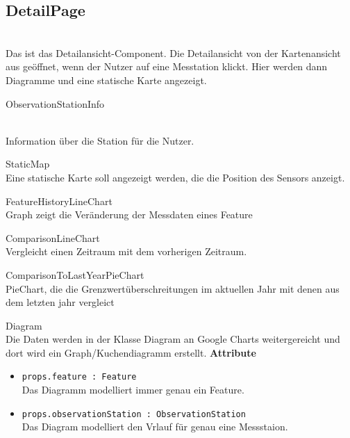 \subsection{DetailPage}
\\Das ist das Detailansicht-Component. Die Detailansicht von der Kartenansicht aus geöffnet, wenn der Nutzer auf eine Messtation klickt. Hier werden dann Diagramme und eine statische Karte angezeigt.
   
    \begin{Class}{ObservationStationInfo}
      
            \\ Information über die Station für die Nutzer.
    \end{Class}

    \begin{Class}{StaticMap}
            \\Eine statische Karte soll angezeigt werden, die die Position des Sensors anzeigt.
    \end{Class}

  
    \begin{Class}{FeatureHistoryLineChart}
           \\ Graph zeigt die Veränderung der Messdaten eines Feature
    \end{Class}

    \begin{Class}{ComparisonLineChart}
            \\Vergleicht einen Zeitraum mit dem vorherigen Zeitraum.
    \end{Class}

    \begin{Class}{ComparisonToLastYearPieChart}
            \\ PieChart, die die Grenzwertüberschreitungen im aktuellen Jahr mit denen aus dem letzten jahr vergleict 
    \end{Class}

    \begin{Class}{Diagram}
        \\Die Daten werden in der Klasse Diagram an Google Charts weitergereicht und dort wird ein Graph/Kuchendiagramm erstellt.
        \textbf{Attribute}
        \begin{itemize}
            \item \texttt{props.feature : Feature}
            \\Das Diagramm modelliert immer genau ein Feature.
            \item \texttt{props.observationStation : ObservationStation}
            \\ Das Diagram modelliert den Vrlauf für genau eine Messstaion.

        \end{itemize}
    \end{Class}

